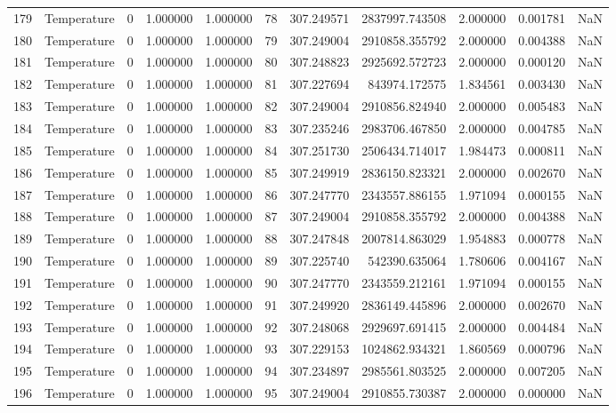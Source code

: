 \begin{tabular}{llrrrrrrrrr}
179 & Temperature & 0 & 1.000000 & 1.000000 & 78 & 307.249571 & 2837997.743508 & 2.000000 & 0.001781 & NaN \\
180 & Temperature & 0 & 1.000000 & 1.000000 & 79 & 307.249004 & 2910858.355792 & 2.000000 & 0.004388 & NaN \\
181 & Temperature & 0 & 1.000000 & 1.000000 & 80 & 307.248823 & 2925692.572723 & 2.000000 & 0.000120 & NaN \\
182 & Temperature & 0 & 1.000000 & 1.000000 & 81 & 307.227694 & 843974.172575 & 1.834561 & 0.003430 & NaN \\
183 & Temperature & 0 & 1.000000 & 1.000000 & 82 & 307.249004 & 2910856.824940 & 2.000000 & 0.005483 & NaN \\
184 & Temperature & 0 & 1.000000 & 1.000000 & 83 & 307.235246 & 2983706.467850 & 2.000000 & 0.004785 & NaN \\
185 & Temperature & 0 & 1.000000 & 1.000000 & 84 & 307.251730 & 2506434.714017 & 1.984473 & 0.000811 & NaN \\
186 & Temperature & 0 & 1.000000 & 1.000000 & 85 & 307.249919 & 2836150.823321 & 2.000000 & 0.002670 & NaN \\
187 & Temperature & 0 & 1.000000 & 1.000000 & 86 & 307.247770 & 2343557.886155 & 1.971094 & 0.000155 & NaN \\
188 & Temperature & 0 & 1.000000 & 1.000000 & 87 & 307.249004 & 2910858.355792 & 2.000000 & 0.004388 & NaN \\
189 & Temperature & 0 & 1.000000 & 1.000000 & 88 & 307.247848 & 2007814.863029 & 1.954883 & 0.000778 & NaN \\
190 & Temperature & 0 & 1.000000 & 1.000000 & 89 & 307.225740 & 542390.635064 & 1.780606 & 0.004167 & NaN \\
191 & Temperature & 0 & 1.000000 & 1.000000 & 90 & 307.247770 & 2343559.212161 & 1.971094 & 0.000155 & NaN \\
192 & Temperature & 0 & 1.000000 & 1.000000 & 91 & 307.249920 & 2836149.445896 & 2.000000 & 0.002670 & NaN \\
193 & Temperature & 0 & 1.000000 & 1.000000 & 92 & 307.248068 & 2929697.691415 & 2.000000 & 0.004484 & NaN \\
194 & Temperature & 0 & 1.000000 & 1.000000 & 93 & 307.229153 & 1024862.934321 & 1.860569 & 0.000796 & NaN \\
195 & Temperature & 0 & 1.000000 & 1.000000 & 94 & 307.234897 & 2985561.803525 & 2.000000 & 0.007205 & NaN \\
196 & Temperature & 0 & 1.000000 & 1.000000 & 95 & 307.249004 & 2910855.730387 & 2.000000 & 0.000000 & NaN \\

\end{tabular}
